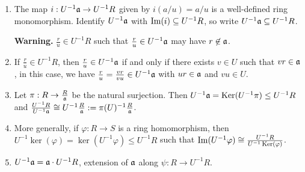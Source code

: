 \begin{proposition}
    \begin{enumerate}
        \item The map $i: U^{-1}\mathfrak{a} \to U^{-1}R$ given by $i(a/u) = a/u$ is a well-defined ring monomorphism. Identify $U^{-1}\mathfrak{a}$ with $\operatorname{Im}(i) \subseteq U^{-1}R$, so write $U^{-1}\mathfrak{a} \subseteq U^{-1}R$. \par 
            \textbf{Warning.} $\frac{r}{u} \in U^{-1}R$ such that $\frac{r}{u} \in U^{-1}\mathfrak{a}$ may have $r \not \in \mathfrak{a}$.
        \item If $\frac{r}{u} \in U^{-1}R$, then $\frac{r}{u} \in U^{-1}\mathfrak{a}$ if and only if there exists $v \in U$ such that $vr \in \mathfrak{a}$, in this case, we have $\frac{r}{u} = \frac{vr}{vu} \in U^{-1}\mathfrak{a}$ with $ur \in \mathfrak{a}$ and $vu \in U$.
        \item Let $\pi: R \to \frac{R}{\mathfrak{a}}$ be the natural surjection. Then $U^{-1}\mathfrak{a} = \operatorname{Ker}(U^{-1} \pi) \leq U^{-1}R$ and $\frac{U^{-1}R}{U^{-1}\mathfrak{a}} \cong U^{-1}\frac{R}{\mathfrak{a}} := \pi(U)^{-1} \frac{R}{\mathfrak{a}}$.
        \item More generally, if $\varphi: R \to S$ is a ring homomorphism, then $U^{-1} \ker(\varphi) = \ker(U^{-1}\varphi) \leq U^{-1}R$ such that $\operatorname{Im}(U^{-1}\varphi) \cong \frac{U^{-1}R}{U^{-1}\operatorname{Ker}(\varphi)}$.
        \item $U^{-1}\mathfrak{a} = \mathfrak{a} \cdot U^{-1}R$, extension of $\mathfrak{a}$ along $\psi: R \to U^{-1}R$.
    \end{enumerate}
\end{proposition}

